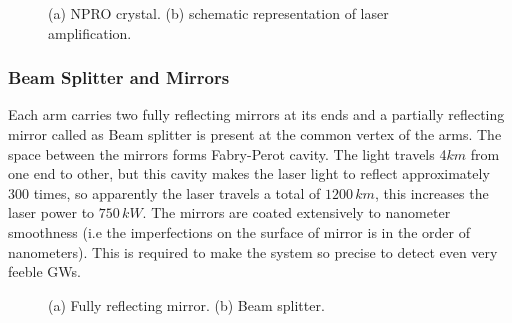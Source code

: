 \begin{figure}[h]
    \centering
    \qquad
    \caption{(a) NPRO crystal. (b) schematic representation of laser amplification. \cite{laser}}
\end{figure}


\subsubsection{Beam Splitter and Mirrors}

Each arm carries two fully reflecting mirrors at its ends and a partially reflecting mirror called as Beam splitter is present at the common vertex of the arms. The space between the mirrors forms Fabry-Perot cavity. The light travels 4$km$ from one end to other, but this cavity makes the laser light to reflect approximately 300 times, so apparently the laser travels a total of $1200\,km$, this increases the laser power to $750\, kW$. The mirrors are coated extensively to nanometer smoothness (i.e the imperfections on the surface of mirror is in the order of nanometers). This is required to make the system so precise to detect even very feeble GWs. \cite{mirrors}

\begin{figure}[h]
    \centering
    \qquad
    \caption{(a) Fully reflecting mirror. (b) Beam splitter. \cite{mirrors}}
\end{figure}


